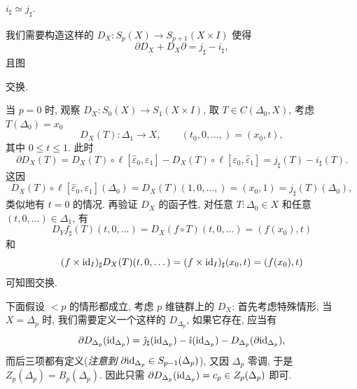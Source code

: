 \begin{Lemma}\label{lem:同伦公理的引理}
	$ i_\sharp\simeq j_\sharp $.
\end{Lemma}
\begin{Proof}
	我们需要构造这样的 $ D_X : S_p(X)\to S_{p+1}(X\times I) $ 使得
	\[
		\partial D_X+D_X\partial=j_\sharp-i_\sharp,
	\]
	且图
	\begin{center}
	\end{center}
	交换.

	当 $ p=0 $ 时, 观察 $ D_X : S_0(X)\to S_1(X\times I) $, 取 $ T\in C(\Delta_0,X) $, 考虑 $ T(\Delta_0)=x_0 $
	\[
		D_X(T) : \Delta_1\to X,\qquad (t_0,0,\dots,)=(x_0,t),
	\]
	其中 $ 0\leqslant t\leqslant 1 $. 此时
	\[
		\partial D_X(T)=D_X(T)\circ\ell[\hat{\varepsilon}_0,\varepsilon_1]-D_X(T)\circ\ell[\varepsilon_0,\hat{\varepsilon}_1]=j_\sharp(T)-i_\sharp(T).
	\]
	这因
	\[
		D_X(T)\circ\ell[\hat{\varepsilon}_0,\varepsilon_1](\Delta_0)=D_X(T)(1,0,\dots,)=(x_0,1)=j_\sharp(T)(\Delta_0),
	\]
	类似地有 $ t=0 $ 的情况. 再验证 $ D_X $ 的函子性, 对任意 $ T : \Delta_0\in X $ 和任意 $ (t,0,\dots)\in\Delta_1 $, 有
	\[
		D_Yf_\sharp(T)(t,0,\dots)=D_X(f\circ T)(t,0,\dots)=(f(x_0),t)
	\]
	和
	\[
		(f\times\mathrm{id}_I)_\sharp D_X(T)(t,0,\dots)=(f\times\mathrm{id}_I)_\sharp(x_0,t)=(f(x_0),t)
	\]
	可知图交换.

	下面假设 $ <p $ 的情形都成立, 考虑 $ p $ 维链群上的 $ D_X $: 首先考虑特殊情形, 当 $ X=\Delta_p $ 时, 我们需要定义一个这样的 $ D_{\Delta_p} $, 如果它存在, 应当有
	\[
		\partial D_{\Delta_p}(\mathrm{id}_{\Delta_p})=\hat{\jmath}_\sharp(\mathrm{id}_{\Delta_p})-\hat{\imath}(\mathrm{id}_{\Delta_p})-D_{\Delta_p}(\partial\mathrm{id}_{\Delta_p}),
	\]
	而后三项都有定义(\textit{注意到 $ \partial\mathrm{id}_{\Delta_p}\in S_{p-1}(\Delta_p) $}), 又因 $ \Delta_p $ 零调, 于是 $ Z_p(\Delta_p)=B_p(\Delta_p) $. 因此只需 $ \partial D_{\Delta_p}(\mathrm{id}_{\Delta_p})=c_p\in Z_p(\Delta_p) $ 即可.


\end{Proof}
